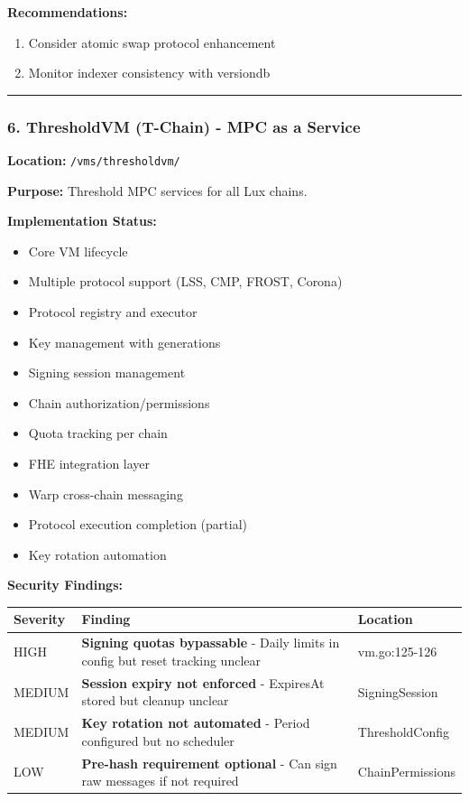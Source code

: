 \documentclass[
]{article}
\newcounter{none} %
\providecommand{\tightlist}{%
  \setlength{\itemsep}{0pt}\setlength{\parskip}{0pt}}
\begin{document}
\textbf{Recommendations:}

\begin{enumerate}
\def\labelenumi{\arabic{enumi}.}
\tightlist
\item
  Consider atomic swap protocol enhancement
\item
  Monitor indexer consistency with versiondb
\end{enumerate}

\begin{center}\rule{0.5\linewidth}{0.5pt}\end{center}

\subsubsection{6. ThresholdVM (T-Chain) - MPC as a
Service}\label{6-thresholdvm-t-chain---mpc-as-a-service}

\textbf{Location:} \texttt{/vms/thresholdvm/}

\textbf{Purpose:} Threshold MPC services for all Lux chains.

\textbf{Implementation Status:}

\begin{itemize}
\tightlist
\item[$\boxtimes$]
  Core VM lifecycle
\item[$\boxtimes$]
  Multiple protocol support (LSS, CMP, FROST, Corona)
\item[$\boxtimes$]
  Protocol registry and executor
\item[$\boxtimes$]
  Key management with generations
\item[$\boxtimes$]
  Signing session management
\item[$\boxtimes$]
  Chain authorization/permissions
\item[$\boxtimes$]
  Quota tracking per chain
\item[$\boxtimes$]
  FHE integration layer
\item[$\boxtimes$]
  Warp cross-chain messaging
\item[$\square$]
  Protocol execution completion (partial)
\item[$\square$]
  Key rotation automation
\end{itemize}

\textbf{Security Findings:}

{\def\LTcaptype{none} %
\begin{longtable}[]{@{}lll@{}}
\toprule\noalign{}
Severity & Finding & Location \\
\midrule\noalign{}
\endhead
\bottomrule\noalign{}
\endlastfoot
HIGH & \textbf{Signing quotas bypassable} - Daily limits in config but
reset tracking unclear & vm.go:125-126 \\
MEDIUM & \textbf{Session expiry not enforced} - ExpiresAt stored but
cleanup unclear & SigningSession \\
MEDIUM & \textbf{Key rotation not automated} - Period configured but no
scheduler & ThresholdConfig \\
LOW & \textbf{Pre-hash requirement optional} - Can sign raw messages if
not required & ChainPermissions \\
\end{longtable}
}
\end{document}
